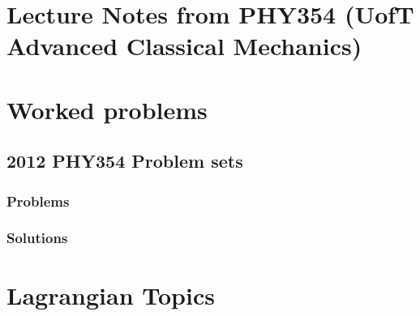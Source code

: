 \part{Lecture Notes from PHY354 (UofT Advanced Classical Mechanics)}
   
   
   
   

\part{Worked problems}
   \chapter{2012 PHY354 Problem sets}
      \section{Problems}
         
      \section{Solutions}
         \shipoutAnswer

\part{Lagrangian Topics}
   
   
   
   
   
   
   

